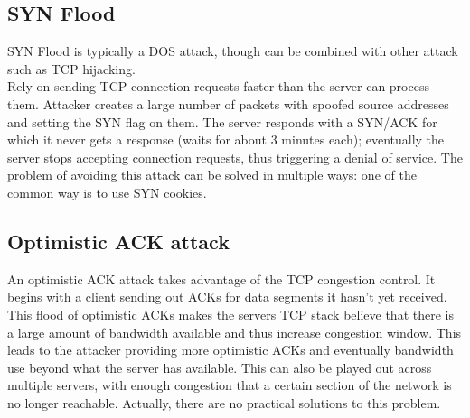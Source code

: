 \subsection{SYN Flood}
SYN Flood is typically a DOS attack, though can be combined with other attack such as TCP hijacking.\\
Rely on sending TCP connection requests faster than the server can process them. Attacker creates a large number of packets with spoofed source addresses and setting the SYN flag on them. The server responds with a SYN/ACK for which it never gets a response (waits for about 3 minutes each); eventually the server stops accepting connection requests, thus triggering a denial of service.
The problem of avoiding this attack can be solved in multiple ways: one of the common way is to use SYN cookies.

\subsection{Optimistic ACK attack}
An optimistic ACK attack takes advantage of the TCP congestion control. It begins with a client sending out ACKs for data segments it hasn't yet received. This flood of optimistic ACKs makes the servers TCP stack believe that there is a large amount of bandwidth available and thus increase congestion window. This leads to the attacker providing more optimistic ACKs and eventually bandwidth use beyond what the server has available. This can also be played out across multiple servers, with enough congestion that a certain section of the network is no longer reachable. Actually, there are no practical solutions to this problem.
